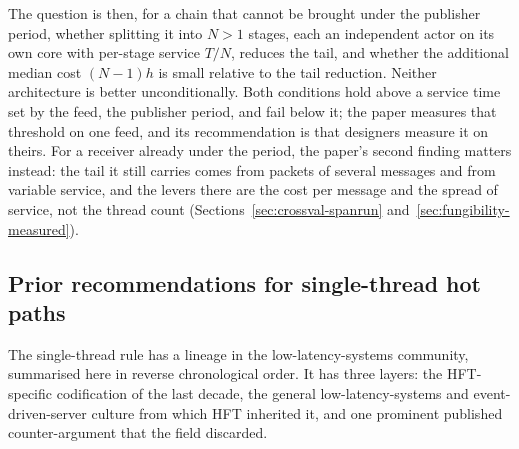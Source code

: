 \documentclass[11pt]{article}
\begin{document}
The question is then, for a chain that cannot be brought under the publisher period,
whether splitting it into $N > 1$ stages, each an independent actor on its own core with
per-stage service $T/N$, reduces the tail, and whether the additional median cost
$(N-1)h$ is small relative to the tail reduction. Neither architecture is better
unconditionally. Both conditions hold above a service time set by the feed, the
publisher period, and fail below it; the paper measures that threshold on one feed, and
its recommendation is that designers measure it on theirs. For a receiver already under
the period, the paper's second finding matters instead: the tail it still carries comes
from packets of several messages and from variable service, and the levers there are the
cost per message and the spread of service, not the thread count
(Sections~\ref{sec:crossval-spanrun} and~\ref{sec:fungibility-measured}).

\subsection{Prior recommendations for single-thread hot paths}
\label{sec:intro-singlethread-priors}

The single-thread rule has a lineage in the low-latency-systems community, summarised
here in reverse chronological order. It has three layers: the HFT-specific codification of the
last decade, the general low-latency-systems and event-driven-server culture from which
HFT inherited it, and one prominent published counter-argument that the field discarded.
\end{document}
